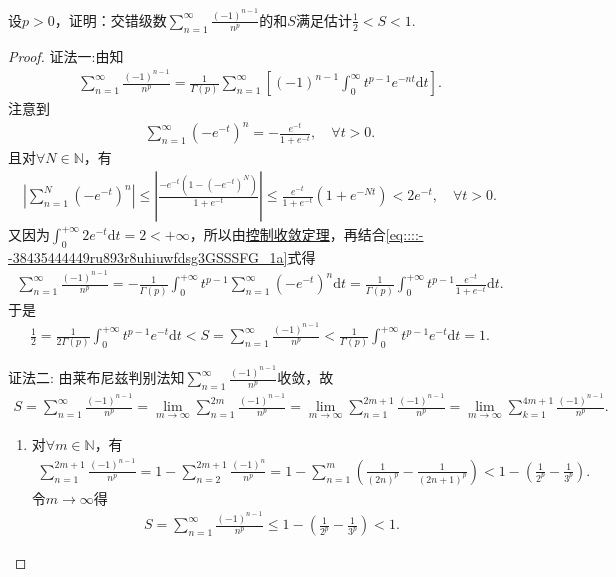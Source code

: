 \documentclass[../../main.tex]{subfiles}%
\begin{document}
\begin{example}
设$p>0$，证明：交错级数$\sum\limits_{n=1}^{\infty} \frac{(-1)^{n-1}}{n^p}$的和$S$满足估计$\frac{1}{2} < S < 1$.
\end{example}
\begin{proof}

{\color{blue}证法一:}由知
\begin{align}\label{eq::::--38435444449ru893r8uhiuwfdsg3GSSSFG_1a}
\sum\limits_{n=1}^{\infty}\frac{(-1)^{n-1}}{n^p}=\frac{1}{\Gamma(p)}\sum\limits_{n=1}^{\infty}\left[ (-1)^{n-1}\int_{0}^{\infty} t^{p-1}e^{-nt}\mathrm{d}t \right].
\end{align}
注意到
\begin{align*}
\sum\limits_{n=1}^{\infty}(-e^{-t})^n=-\frac{e^{-t}}{1+e^{-t}},\quad \forall t>0.
\end{align*}
且对$\forall N\in \mathbb{N}$，有
\begin{align*}
\left| \sum\limits_{n=1}^N (-e^{-t})^n \right|\leqslant \left| \frac{-e^{-t}\left( 1-(-e^{-t})^N \right)}{1+e^{-t}} \right|\leqslant \frac{e^{-t}}{1+e^{-t}}\left( 1+e^{-Nt} \right) <2e^{-t},\quad \forall t>0.
\end{align*}
又因为$\int_{0}^{+\infty}2e^{-t}\mathrm{d}t=2<+\infty$，所以由\hyperref[Real-Analysis-theorem:控制收敛定理]{控制收敛定理}，再结合\eqref{eq::::--38435444449ru893r8uhiuwfdsg3GSSSFG_1a}式得
\begin{align*}
\sum\limits_{n=1}^{\infty}\frac{(-1)^{n-1}}{n^p}=-\frac{1}{\Gamma(p)}\int_{0}^{+\infty}t^{p-1}\sum\limits_{n=1}^{\infty}(-e^{-t})^n \mathrm{d}t=\frac{1}{\Gamma(p)}\int_{0}^{+\infty}t^{p-1}\frac{e^{-t}}{1+e^{-t}}\mathrm{d}t.
\end{align*}
于是
\begin{align*}
\frac{1}{2}=\frac{1}{2\Gamma(p)}\int_{0}^{+\infty}t^{p-1}e^{-t}\mathrm{d}t<S=\sum\limits_{n=1}^{\infty}\frac{(-1)^{n-1}}{n^p}<\frac{1}{\Gamma(p)}\int_{0}^{+\infty}t^{p-1}e^{-t}\mathrm{d}t=1.
\end{align*}

{\color{blue}证法二:}
由莱布尼兹判别法知$\sum\limits_{n=1}^{\infty} \frac{(-1)^{n-1}}{n^p}$收敛，故
\begin{align*}
S=\sum_{n=1}^{\infty}{\frac{(-1)^{n-1}}{n^p}}=\lim_{m\rightarrow \infty} \sum_{n=1}^{2m}{\frac{(-1)^{n-1}}{n^p}}=\lim_{m\rightarrow \infty} \sum_{n=1}^{2m+1}{\frac{(-1)^{n-1}}{n^p}}=\lim_{m\rightarrow \infty} \sum_{k=1}^{4m+1}{\frac{\left( -1 \right) ^{n-1}}{n^p}}.
\end{align*}
\begin{enumerate}[(1)]
\item 对$\forall m\in \mathbb{N}$，有
\begin{align*}
\sum\limits_{n=1}^{2m+1} \frac{(-1)^{n-1}}{n^p} = 1 - \sum\limits_{n=2}^{2m+1} \frac{(-1)^n}{n^p} = 1 - \sum\limits_{n=1}^{m} \left( \frac{1}{(2n)^p} - \frac{1}{(2n+1)^p} \right) < 1 - \left( \frac{1}{2^p} - \frac{1}{3^p} \right).
\end{align*}
令$m\to\infty$得
\begin{align*}
S=\sum\limits_{n=1}^{\infty} \frac{(-1)^{n-1}}{n^p} \leqslant 1 - \left( \frac{1}{2^p} - \frac{1}{3^p} \right) < 1.
\end{align*}


\end{enumerate}
\end{proof}
\end{document}
